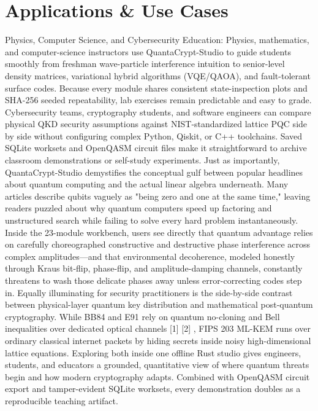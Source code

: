 \documentclass[10pt,letterpaper]{article}
\begin{document}
\section{Applications \& Use Cases}
Physics, Computer Science, and Cybersecurity Education: Physics, mathematics, and computer-science instructors use QuantaCrypt-Studio to guide students smoothly from freshman wave-particle interference intuition to senior-level density matrices, variational hybrid algorithms (VQE/QAOA), and fault-tolerant surface codes. Because every module shares consistent state-inspection plots and SHA-256 seeded repeatability, lab exercises remain predictable and easy to grade. Cybersecurity teams, cryptography students, and software engineers can compare physical QKD security assumptions against NIST-standardized lattice PQC side by side without configuring complex Python, Qiskit, or C++ toolchains. Saved SQLite worksets and OpenQASM circuit files make it straightforward to archive classroom demonstrations or self-study experiments. Just as importantly, QuantaCrypt-Studio demystifies the conceptual gulf between popular headlines about quantum computing and the actual linear algebra underneath. Many articles describe qubits vaguely as "being zero and one at the same time," leaving readers puzzled about why quantum computers speed up factoring and unstructured search while failing to solve every hard problem instantaneously. Inside the 23-module workbench, users see directly that quantum advantage relies on carefully choreographed constructive and destructive phase interference across complex amplitudes---and that environmental decoherence, modeled honestly through Kraus bit-flip, phase-flip, and amplitude-damping channels, constantly threatens to wash those delicate phases away unless error-correcting codes step in. Equally illuminating for security practitioners is the side-by-side contrast between physical-layer quantum key distribution and mathematical post-quantum cryptography. While BB84 and E91 rely on quantum no-cloning and Bell inequalities over dedicated optical channels [1] [2] , FIPS 203 ML-KEM runs over ordinary classical internet packets by hiding secrets inside noisy high-dimensional lattice equations. Exploring both inside one offline Rust studio gives engineers, students, and educators a grounded, quantitative view of where quantum threats begin and how modern cryptography adapts. Combined with OpenQASM circuit export and tamper-evident SQLite worksets, every demonstration doubles as a reproducible teaching artifact.
\end{document}
